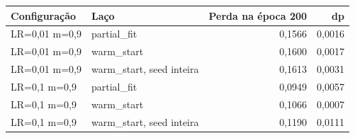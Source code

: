 \begin{tabular}{llrr}
\toprule
Configuração & Laço & Perda na época 200 & dp \\
\midrule
LR=0,01 m=0,9 & partial\_fit & 0,1566 & 0,0016 \\
LR=0,01 m=0,9 & warm\_start & 0,1600 & 0,0017 \\
LR=0,01 m=0,9 & warm\_start, seed inteira & 0,1613 & 0,0031 \\
LR=0,1 m=0,9 & partial\_fit & 0,0949 & 0,0057 \\
LR=0,1 m=0,9 & warm\_start & 0,1066 & 0,0007 \\
LR=0,1 m=0,9 & warm\_start, seed inteira & 0,1190 & 0,0111 \\
\bottomrule
\end{tabular}
